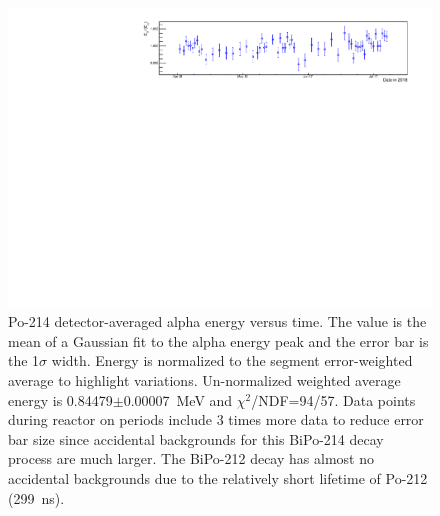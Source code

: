 \FloatBarrier
\newpage
\begin{figure}[!h]
\centering
\includegraphics[width=1.05\textwidth]{figures/PubBiPo214EvsT.pdf}
\caption{\label{fig:EvsT214}Po-214 detector-averaged alpha energy versus time. The value is the mean of a Gaussian fit to the alpha energy peak and the error bar is the 1$\sigma$ width. Energy is normalized to the segment error-weighted average to highlight variations. Un-normalized weighted average energy is 0.84479$\pm$0.00007~MeV and $\chi^2$/NDF=94/57. Data points during reactor on periods include 3 times more data to reduce error bar size since accidental backgrounds for this BiPo-214 decay process are much larger. The BiPo-212 decay has almost no accidental backgrounds due to the relatively short lifetime of Po-212 (299~ns).}
\end{figure}
